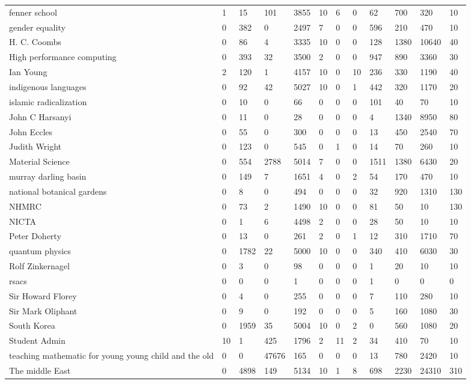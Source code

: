 \begin{table}
\begin{tabular*}{0.5\textwidth}{|p{4cm}|l|l|l|l|l|l|l|l|l|l|l|}
\cline{1-12}
fenner school &1 &15 &101 &3855 &10 &6 &0 &62 &700 &320 &10\\
\cline{1-12}
gender equality &0 &382 &0 &2497 &7 &0 &0 &596 &210 &470 &10\\
\cline{1-12}
H. C. Coombs &0 &86 &4 &3335 &10 &0 &0 &128 &1380 &10640 &40\\
\cline{1-12}
High performance computing &0 &393 &32 &3500 &2 &0 &0 &947 &890 &3360 &30\\
\cline{1-12}
Ian Young &2 &120 &1 &4157 &10 &0 &10 &236 &330 &1190 &40\\
\cline{1-12}
indigenous languages &0 &92 &42 &5027 &10 &0 &1 &442 &320 &1170 &20\\
\cline{1-12}
islamic radicalization &0 &10 &0 &66 &0 &0 &0 &101 &40 &70 &10\\
\cline{1-12}
John C Harsanyi &0 &11 &0 &28 &0 &0 &0 &4 &1340 &8950 &80\\
\cline{1-12}
John Eccles &0 &55 &0 &300 &0 &0 &0 &13 &450 &2540 &70\\
\cline{1-12}
Judith Wright &0 &123 &0 &545 &0 &1 &0 &14 &70 &260 &10\\
\cline{1-12}
Material Science &0 &554 &2788 &5014 &7 &0 &0 &1511 &1380 &6430 &20\\
\cline{1-12}
murray darling basin &0 &149 &7 &1651 &4 &0 &2 &54 &170 &470 &10\\
\cline{1-12}
national botanical gardens &0 &8 &0 &494 &0 &0 &0 &32 &920 &1310 &130\\
\cline{1-12}
NHMRC &0 &73 &2 &1490 &10 &0 &0 &81 &50 &10 &130\\
\cline{1-12}
NICTA &0 &1 &6 &4498 &2 &0 &0 &28 &50 &10 &10\\
\cline{1-12}
Peter Doherty &0 &13 &0 &261 &2 &0 &1 &12 &310 &1710 &70\\
\cline{1-12}
quantum physics &0 &1782 &22 &5000 &10 &0 &0 &340 &410 &6030 &30\\
\cline{1-12}
Rolf Zinkernagel &0 &3 &0 &98 &0 &0 &0 &1 &20 &10 &10\\
\cline{1-12}
rsacs &0 &0 &0 &1 &0 &0 &0 &1 &0 &0 &0\\
\cline{1-12}
Sir Howard Florey &0 &4 &0 &255 &0 &0 &0 &7 &110 &280 &10\\
\cline{1-12}
Sir Mark Oliphant &0 &9 &0 &192 &0 &0 &0 &5 &160 &1080 &30\\
\cline{1-12}
South Korea &0 &1959 &35 &5004 &10 &0 &2 &0 &560 &1080 &20\\
\cline{1-12}
Student Admin &10 &1 &425 &1796 &2 &11 &2 &34 &410 &70 &10\\
\cline{1-12}
teaching mathematic for young young child and the old &0 &0 &47676 &165 &0 &0 &0 &13 &780 &2420 &10\\
\cline{1-12}
The middle East &0 &4898 &149 &5134 &10 &1 &8 &698 &2230 &24310 &310\\
\cline{1-12}
\end{tabular*}
\end{table}

